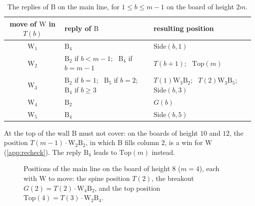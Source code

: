 \documentclass[11pt,a4paper]{article}
\theoremstyle{plain}
\theoremstyle{definition}
\newcommand{\B}{\mathrm{B}}
\newcommand{\W}{\mathrm{W}}
\newcommand{\Top}{\mathrm{Top}}
\newcommand{\Side}{\mathrm{Side}}
\begin{document}
\begin{table}[!htbp]
\centering
\caption{The replies of $\B$ on the main line, for $1\le b\le m-1$ on the board of height $2m$.}
\label{tab:spine}
\small
\begin{tabular}{@{}cll@{}}
\toprule
move of $\W$ in $T(b)$ & reply of $\B$ & resulting position \\
\midrule
$\W_1$ & $\B_4$ & $\Side(b,1)$ \\
$\W_2$ & $\B_2$ if $b<m-1$; \ $\B_4$ if $b=m-1$ & $T(b+1)$; \ $\Top(m)$ \\
$\W_3$ & $\B_2$ if $b=1$; \ $\B_5$ if $b=2$; \ $\B_4$ if $b\ge 3$ & $T(1)\W_3\B_2$; \ $T(2)\W_3\B_5$; \ $\Side(b,3)$ \\
$\W_4$ & $\B_2$ & $G(b)$ \\
$\W_5$ & $\B_4$ & $\Side(b,5)$ \\
\bottomrule
\end{tabular}
\end{table}

At the top of the wall $\B$ must not cover: on the boards of height $10$ and $12$, the position $T(m-1)\cdot\W_2\B_2$, in which $\B$ fills column $2$, is a win for $\W$ (\cref{app:recheck}). The reply $\B_4$ leads to $\Top(m)$ instead.

\begin{figure}[!htbp]
\centering
{}
\caption{Positions of the main line on the board of height $8$ ($m=4$), each with $\W$ to move: the spine position $T(2)$, the breakout $G(2)=T(2)\cdot\W_4\B_2$, and the top position $\Top(4)=T(3)\cdot\W_2\B_4$.}
\label{fig:spine}
\end{figure}
\end{document}
